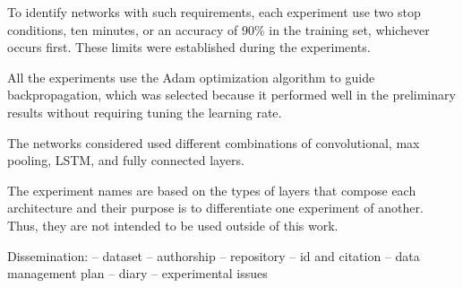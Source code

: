 To identify networks with such requirements, each experiment use two stop conditions, ten minutes, or an accuracy of 90\% in the training set, whichever occurs first. These limits were established during the experiments.



All the experiments use the Adam \cite{kingma_adam:_2014}
optimization algorithm to guide backpropagation, which was selected because it performed well in the preliminary results without requiring tuning the learning rate.

The networks considered used different combinations of convolutional, max pooling, LSTM, and fully connected layers.

The experiment names are based on the types of layers that compose each architecture and their purpose is to differentiate one experiment of another. Thus, they are not intended to be used outside of this work.






Dissemination:
-- dataset
-- authorship
-- repository
-- id and citation
-- data management plan
-- diary
-- experimental issues
